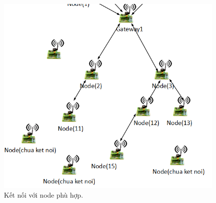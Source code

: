 \begin{enumerate}
\begin{center}
    \begin{figure}[htp]
    \begin{center}
     \includegraphics[scale=0.45]{image2/daketnoi.png}
    \end{center}
    \caption{Kết nối với node phù hợp.}
    \label{refhinh1}
    \end{figure}
\end{center}
\end{enumerate}
